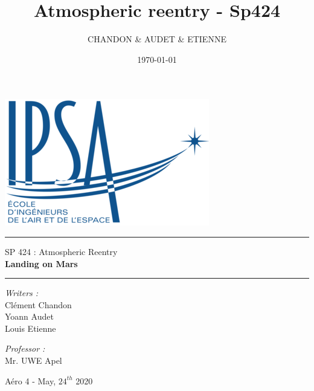 \documentclass[12pt, a4paper, openright]{report}
\title{Atmospheric reentry - Sp424}
\author{CHANDON \& AUDET \& ETIENNE}
\date{\today}
\begin{document}
	\begin{titlepage}
		
		\vspace*{20pt}
		\begin{center}
			\includegraphics[scale=0.75]{ipsa}\\
		\end{center}
		
		\rule{\linewidth}{0.5mm}
		{ \huge \bfseries
				\begin{center}
					\large{SP 424 : Atmospheric Reentry\\}
					\Huge{\bfseries{Landing on Mars}}
				\end{center}
		}
		\rule{\linewidth}{0.5mm} %
		\begin{center}\bfseries\Large
		\end{center}
		\noindent
		\begin{minipage}{0.6\textwidth}
			\begin{flushleft} \large
				\emph{Writers :}\\
				Clément Chandon\\
				Yoann Audet\\
				Louis Etienne
			\end{flushleft}
		\end{minipage}%
		\begin{minipage}{0.5\textwidth}
			\begin{flushright} \large
				\emph{Professor :} \\
				Mr. UWE Apel
			\end{flushright}
		\end{minipage}
	\begin{figure}[H]
		\centering
	\end{figure}
	\vspace{200pt}
	\begin{center}
	\large{Aéro 4 - May, $24^{th}$  2020}
	\end{center}
	\end{titlepage}
	\tableofcontents
	\newpage
	
	
	
\end{document}

